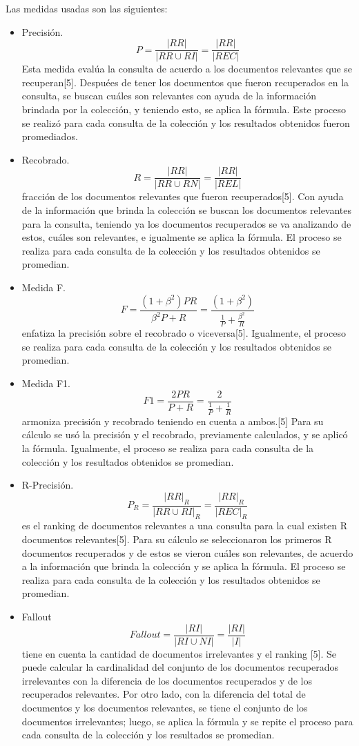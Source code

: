 \documentclass[twoside]{article}
\begin{document}
Las medidas usadas son las siguientes:
\begin{itemize}
\item Precisi\'on. $$P = \frac{|RR|}{|RR \cup RI|} = \frac{|RR|}{|REC|}$$ Esta medida eval\'ua la consulta de acuerdo a los documentos relevantes que se recuperan[5]. Despu\'ees de tener los documentos que fueron recuperados en la consulta, se buscan cu\'ales son relevantes con ayuda de la informaci\'on brindada por la colecci\'on, y teniendo esto, se aplica la f\'ormula. Este proceso se realiz\'o para cada consulta de la colecci\'on y los resultados obtenidos fueron promediados.

\item Recobrado. $$R = \frac{|RR|}{|RR \cup RN|} = \frac{|RR|}{|REL|}$$ fracci\'on de los documentos relevantes que fueron recuperados[5]. Con ayuda de la informaci\'on que brinda la colecci\'on se buscan los documentos relevantes para la consulta, teniendo ya los documentos recuperados se va analizando de estos, cu\'ales son relevantes, e igualmente se aplica la f\'ormula. El proceso se realiza para cada consulta de la colecci\'on y los resultados obtenidos se promedian.

\item Medida F. $$F = \frac{(1+\beta^2)PR}{\beta^2P + R} = \frac{(1+\beta^2)}{\frac{1}{P} + \frac{\beta^2}{R}}$$ enfatiza la precisi\'on sobre el recobrado o viceversa[5]. Igualmente, el proceso se realiza para cada consulta de la colecci\'on y los resultados obtenidos se promedian.

\item Medida F1. $$F1 = \frac{2PR}{P+R} = \frac{2}{\frac{1}{P} + \frac{1}{R}}$$ armoniza precisi\'on y recobrado teniendo en cuenta a ambos.[5] Para su c\'alculo se us\'o la precisi\'on y el recobrado, previamente calculados, y se aplic\'o la
f\'ormula. Igualmente, el proceso se realiza para cada consulta de la colecci\'on y los resultados obtenidos se promedian.

\item R-Precisi\'on. $$P_R = \frac{|RR|_R}{|RR \cup RI|_R} = \frac{|RR|_R}{|REC|_R}$$ es el ranking de documentos relevantes a una consulta para la cual existen R documentos relevantes[5]. Para su c\'alculo se seleccionaron los primeros R documentos recuperados y de estos se vieron cu\'ales son relevantes, de acuerdo a la informaci\'on que brinda la colecci\'on y se aplica la f\'ormula. El proceso se realiza para cada consulta de la colecci\'on y los resultados obtenidos se promedian.

\item Fallout $$Fallout = \frac{|RI|}{|RI \cup NI|} = \frac{|RI|}{|I|}$$ tiene en cuenta la cantidad de documentos irrelevantes
y el ranking [5]. Se puede calcular la cardinalidad del conjunto de los documentos recuperados irrelevantes con la diferencia de los documentos recuperados y de los recuperados relevantes. Por otro lado, con la diferencia del total de documentos y los documentos relevantes, se tiene el conjunto de los documentos irrelevantes; luego, se aplica la f\'ormula y se repite el
proceso para cada consulta de la colecci\'on y los resultados se promedian.
\end{itemize}
\end{document}
